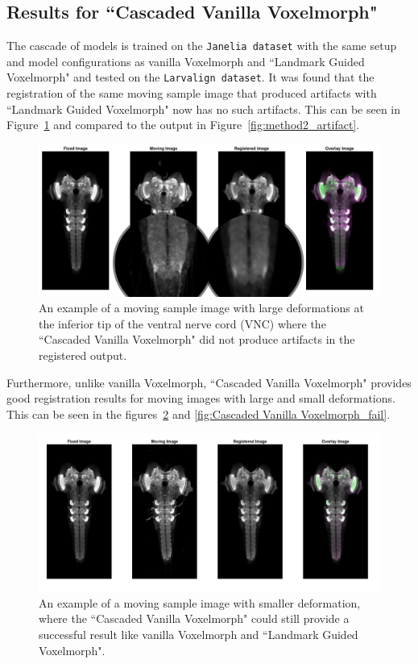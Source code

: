 \documentclass{book}
\begin{document}
	\subsection{Results for ``Cascaded Vanilla Voxelmorph"}
	The cascade of models is trained on the \texttt{Janelia dataset} with the same setup and model configurations as vanilla Voxelmorph and ``Landmark Guided Voxelmorph" and tested on the \texttt{Larvalign dataset}. It was found that the registration of the same moving sample image that produced artifacts with ``Landmark Guided Voxelmorph" now has no such artifacts. This can be seen in Figure~\ref{fig:Cascaded Vanilla Voxelmorph_artifact} and compared to the output in Figure~\ref{fig:method2_artifact}.
	
	\begin{figure}[h!]
		\centering
		\includegraphics[width=0.9\columnwidth]{resources/chapter4/Method3/compare/np_52B07_52H01_MB262B_021713B_scaled.png}
		\caption{An example of a moving sample image with large deformations at the inferior tip of the ventral nerve cord (VNC) where the ``Cascaded Vanilla Voxelmorph" did not produce artifacts in the registered output.}
		\label{fig:Cascaded Vanilla Voxelmorph_artifact}
	\end{figure}
	
	Furthermore, unlike vanilla Voxelmorph, ``Cascaded Vanilla Voxelmorph" provides good registration results for moving images with large and small deformations. This can be seen in the figures~\ref{fig:Cascaded Vanilla Voxelmorph_pas} and \ref{fig:Cascaded Vanilla Voxelmorph_fail}.
	
	\begin{figure}[h!]
		\centering
		\includegraphics[width=0.9\columnwidth]{resources/chapter4/Method3/compare/np_brain7_scaled.tif.png}
		\caption{An example of a moving sample image with smaller deformation, where the ``Cascaded Vanilla Voxelmorph" could still provide a successful result like vanilla Voxelmorph and ``Landmark Guided Voxelmorph".}
		\label{fig:Cascaded Vanilla Voxelmorph_pas}
	\end{figure}
	
\end{document}
